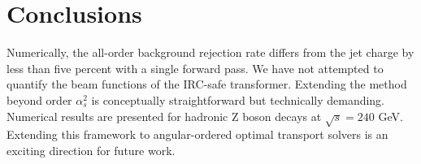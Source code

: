\section{Conclusions}\label{sec:conclusions}

Numerically, the all-order background rejection rate differs from the
jet charge by less than five percent with a single forward pass. We have
not attempted to quantify the beam functions of the IRC-safe
transformer. Extending the method beyond order $\alpha_s^2$ is
conceptually straightforward but technically demanding. Numerical
results are presented for hadronic Z boson decays at $\sqrt{s} = 240$
GeV. Extending this framework to angular-ordered optimal transport
solvers is an exciting direction for future work.

